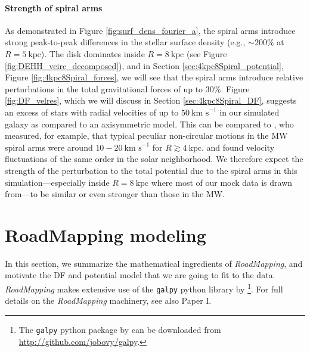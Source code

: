 \documentclass[iop,revtex4,numberedappendix,appendixfloats]{emulateapj}
\newcommand{\RM}{{\sl RoadMapping}}
\begin{document}
\paragraph{Strength of spiral arms} As demonstrated in Figure \ref{fig:surf_dens_fourier_a}, the spiral arms introduce strong peak-to-peak differences in the stellar surface density (e.g., $\sim200\%$ at $R=5~\text{kpc}$). The disk dominates inside $R=8~\text{kpc}$ (see Figure \ref{fig:DEHH_vcirc_decomposed}), and in Section \ref{sec:4kpc8Spiral_potential}, Figure \ref{fig:4kpc8Spiral_forces}, we will see that the spiral arms introduce relative perturbations in the total gravitational forces of up to $30\%$. Figure \ref{fig:DF_velres}, which we will discuss in Section \ref{sec:4kpc8Spiral_DF}, suggests an excess of stars with radial velocities of up to $50~\text{km s}^{-1}$ in our simulated galaxy as compared to an axisymmetric model. This can be compared to \citet{2014ApJ...783..130R}, who measured, for example, that typical peculiar non-circular motions in the MW spiral arms were around $10-20~\text{km s}^{-1}$ for $R \gtrsim 4~\text{kpc}$. \citet{2012MNRAS.425.2335S} and \citet{2015ApJ...800...83B} found velocity fluctuations of the same order in the solar neighborhood. We therefore expect the strength of the perturbation to the total potential due to the spiral arms in this simulation---especially inside $R=8~\text{kpc}$ where most of our mock data is drawn from---to be similar or even stronger than those in the MW.

\section{RoadMapping modeling} \label{sec:RoadMapping}

In this section, we summarize the mathematical ingredients of \RM{}, and motivate the DF and potential model that we are going to fit to the data. \RM{} makes extensive use of the \texttt{galpy} python library by \citet{2015ApJS..216...29B}\footnote{The \texttt{galpy} python package by \citet{2015ApJS..216...29B} can be downloaded from \url{http://github.com/jobovy/galpy}.}. For full details on the \RM{} machinery, see also Paper I.
\end{document}
